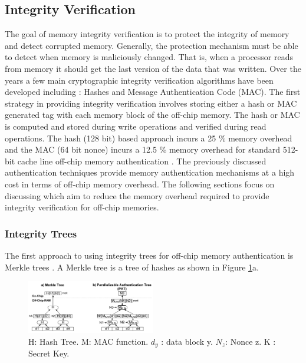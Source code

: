 \subsection{Integrity Verification}
The goal of memory integrity verification is to protect the integrity of
memory and detect corrupted memory. Generally, the protection mechanism must be
able to detect when memory is maliciously changed. That is, when a processor
reads from memory it should get the last version of the data that was written.
Over the years a few main cryptographic integrity verification
algorithms have been developed including : Hashes and Message Authentication
Code (MAC). The first strategy in providing integrity verification involves
storing either a hash or MAC generated tag with each memory block of the
off-chip memory.  The hash or MAC is computed and stored during write
operations and verified during read operations. The hash (128 bit) based
approach incurs a 25 \% memory overhead and the MAC (64 bit nonce) incurs a
12.5 \% memory overhead for standard 512-bit cache line off-chip memory
authentication \cite{surveyInt}.  The previously discussed authentication
techniques provide memory authentication mechanisms at a high cost in terms of
off-chip memory overhead.  The following sections focus on discussing
 which aim to reduce the memory overhead required to
provide integrity verification for off-chip memories.

\subsubsection{Integrity Trees}

The first approach to using integrity trees for off-chip memory authentication
is Merkle trees \cite{merkle}. A Merkle tree is a tree of hashes as shown in
Figure \ref{fig:intTree}a.

\begin{figure}[!htb]
  \centering
  \includegraphics[width=0.5\textwidth]{figs/integrityTrees.PNG}
  \caption{H: Hash Tree. M: MAC function. $d_y$ : data block y. $N_z$: Nonce z.
  K : Secret Key.\cite{surveyInt}}
  \label{fig:intTree}
\end{figure}

